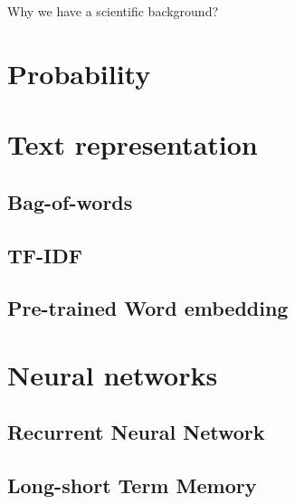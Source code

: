 Why we have a scientific background?

\section{Probability}
\section{Text representation}
\subsection{Bag-of-words}
\subsection{TF-IDF}
\subsection{Pre-trained Word embedding}

\section{Neural networks}
\subsection{Recurrent Neural Network}
\subsection{Long-short Term Memory}

